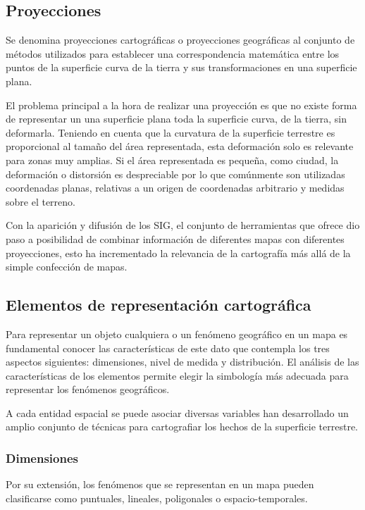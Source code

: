 \subsection{Proyecciones}
Se denomina proyecciones cartográficas o proyecciones geográficas al conjunto de métodos utilizados para establecer
una correspondencia matemática entre los puntos de la superficie curva de la tierra y sus transformaciones en una
superficie plana. 

El problema principal a la hora de realizar una proyección es que no existe forma de representar un una superficie
plana toda la superficie curva, de la tierra, sin deformarla. Teniendo en cuenta que la curvatura de la superficie terrestre
es proporcional al tamaño del área representada, esta deformación solo es relevante para zonas muy amplias. Si el área
representada es pequeña, como ciudad, la deformación o distorsión es despreciable por lo que comúnmente son utilizadas
coordenadas planas, relativas a un origen de coordenadas arbitrario y medidas sobre el terreno.

Con la aparición y difusión de los SIG, el conjunto de herramientas que ofrece dio paso a posibilidad
de combinar información de diferentes mapas con diferentes proyecciones, esto ha incrementado la relevancia de la cartografía 
más allá de la simple confección de mapas.

\subsection{Elementos de representación cartográfica}
Para representar un objeto cualquiera o un fenómeno geográfico en un mapa es fundamental conocer las características 
de este dato que contempla los tres aspectos siguientes: dimensiones, nivel de medida y distribución. El análisis de las 
características de los elementos permite elegir la simbología más adecuada para representar los fenómenos geográficos.

A cada entidad espacial se puede asociar diversas variables han desarrollado un amplio conjunto de técnicas para cartografiar
los hechos de la superficie
terrestre.

\subsubsection{Dimensiones}
Por su extensión, los fenómenos que se representan en un mapa pueden clasificarse como puntuales, lineales, poligonales 
o espacio-temporales.

